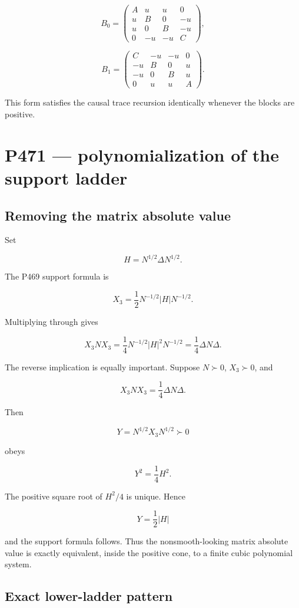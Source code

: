 \documentclass[11pt,a4paper,openany]{report}
\begin{document}
\[
B_0=
\begin{pmatrix}
A&u&u&0\\
u&B&0&-u\\
u&0&B&-u\\
0&-u&-u&C
\end{pmatrix},
\]

\[
B_1=
\begin{pmatrix}
C&-u&-u&0\\
-u&B&0&u\\
-u&0&B&u\\
0&u&u&A
\end{pmatrix}.
\]

This form satisfies the causal trace recursion identically whenever the blocks are positive.

\chapter{P471 --- polynomialization of the support ladder}

\section{Removing the matrix absolute value}

Set

\[
H=N^{1/2}\Delta N^{1/2}.
\]

The P469 support formula is

\[
X_3=\frac12N^{-1/2}|H|N^{-1/2}.
\]

Multiplying through gives

\[
X_3NX_3
=\frac14N^{-1/2}|H|^2N^{-1/2}
=\frac14\Delta N\Delta.
\]

The reverse implication is equally important. Suppose \(N\succ0\), \(X_3\succ0\), and

\[
X_3NX_3=\frac14\Delta N\Delta.
\]

Then

\[
Y=N^{1/2}X_3N^{1/2}\succ0
\]

obeys

\[
Y^2=\frac14H^2.
\]

The positive square root of \(H^2/4\) is unique. Hence

\[
Y=\frac12|H|
\]

and the support formula follows. Thus the nonsmooth-looking matrix absolute value is exactly equivalent, inside the positive cone, to a finite cubic polynomial system.

\section{Exact lower-ladder pattern}
\end{document}
